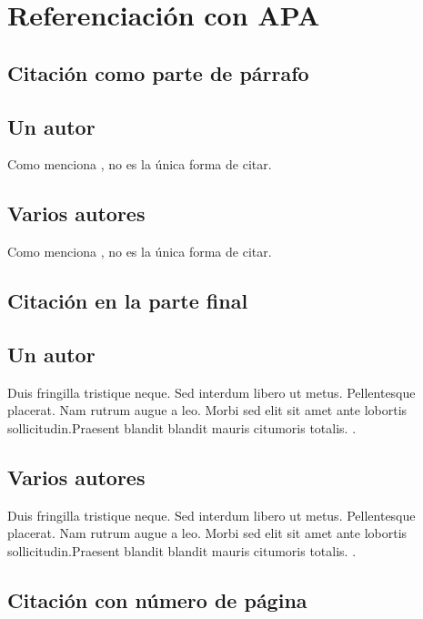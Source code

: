 \section{Referenciación con APA}

\subsection{Citación como parte de párrafo}

\subsection*{Un autor}

Como menciona , no es la única
forma de citar.\\

\subsection*{Varios autores}

Como menciona , no es la única
forma de citar.\\

\subsection{Citación en la parte final}

\subsection*{Un autor}

Duis fringilla tristique neque. Sed interdum libero ut metus.
Pellentesque placerat. Nam rutrum augue a leo. Morbi sed 
elit sit amet ante lobortis sollicitudin.Praesent blandit 
blandit mauris citumoris totalis. \cite{libro:ejemplo}.

\subsection*{Varios autores}

Duis fringilla tristique neque. Sed interdum libero ut metus.
Pellentesque placerat. Nam rutrum augue a leo. Morbi sed 
elit sit amet ante lobortis sollicitudin.Praesent blandit 
blandit mauris citumoris totalis. \cite{libro:ejemplo_varios_autores}.

\subsection{Citación con número de página}

